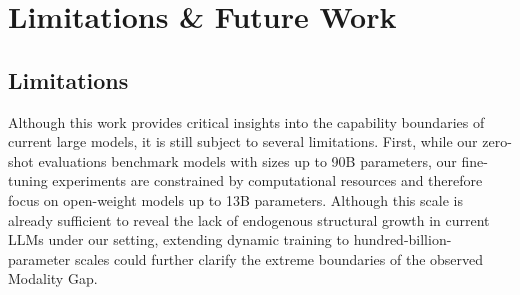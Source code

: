 





\section{Limitations \& Future Work}
\label{app:limitations_future}
\label{sec:limitations}

\subsection{Limitations}
\label{app:limitations}

Although this work provides critical insights into the capability boundaries of current large models, it is still subject to several limitations. First, while our zero-shot evaluations benchmark models with sizes up to 90B parameters, our fine-tuning experiments are constrained by computational resources and therefore focus on open-weight models up to 13B parameters. Although this scale is already sufficient to reveal the lack of endogenous structural growth in current LLMs under our setting, extending dynamic training to hundred-billion-parameter scales could further clarify the extreme boundaries of the observed Modality Gap. 

